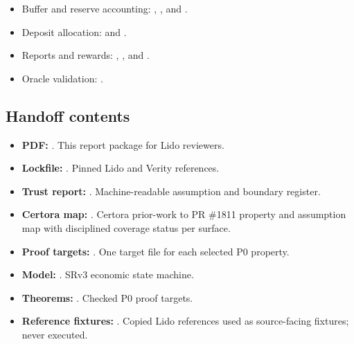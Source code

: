 \begin{itemize}[leftmargin=1.4em,itemsep=2pt,topsep=2pt]
  \item Buffer and reserve accounting:
  ,
  , and .
  \item Deposit allocation:
   and
  .
  \item Reports and rewards:
  ,
  , and
  .
  \item Oracle validation:
  .
\end{itemize}

\subsection*{Handoff contents}

\begin{itemize}[leftmargin=1.4em,itemsep=2pt,topsep=2pt]
  \item \textbf{PDF:} . This
  report package for Lido reviewers.
  \item \textbf{Lockfile:} . Pinned Lido and Verity
  references.
  \item \textbf{Trust report:} .
  Machine-readable assumption and boundary register.
  \item \textbf{Certora map:} .
  Certora prior-work to PR \#1811 property and assumption map with disciplined
  coverage status per surface.
  \item \textbf{Proof targets:} . One target file for each selected
  P0 property.
  \item \textbf{Model:} . SRv3 economic state machine.
  \item \textbf{Theorems:} . Checked P0 proof
  targets.
  \item \textbf{Reference fixtures:} . Copied
  Lido references used as source-facing fixtures; never executed.
\end{itemize}

